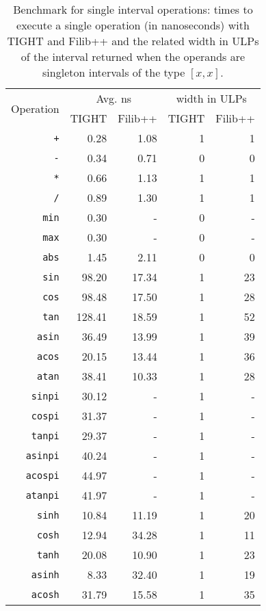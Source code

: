 
\begin{table}
\centering
\caption{Benchmark for single interval operations: times to execute a single operation (in nanoseconds) with TIGHT and Filib++ and the related width in ULPs of the interval returned when the operands are singleton intervals of the type $[x,x]$.}
\label{table:benchmarks}
\begin{tabular}{r|rr|rr}
\multirow{2}{*}{Operation} & \multicolumn{2}{c|}{Avg. ns} & \multicolumn{2}{c}{width in ULPs} \\
& TIGHT & Filib++ & TIGHT & Filib++ \\
\hline
\texttt{+} & 0.28 & 1.08 & 1 & 1 \\
\texttt{-} & 0.34 & 0.71 & 0 & 0 \\
\texttt{*} & 0.66 & 1.13 & 1 & 1 \\
\texttt{/} & 0.89 & 1.30 & 1 & 1 \\
\texttt{min} & 0.30 & - & 0 & - \\
\texttt{max} & 0.30 & - & 0 & - \\
\texttt{abs} & 1.45 & 2.11 & 0 & 0 \\
\texttt{sin} & 98.20 & 17.34 & 1 & 23 \\
\texttt{cos} & 98.48 & 17.50 & 1 & 28 \\
\texttt{tan} & 128.41 & 18.59 & 1 & 52 \\
\texttt{asin} & 36.49 & 13.99 & 1 & 39 \\
\texttt{acos} & 20.15 & 13.44 & 1 & 36 \\
\texttt{atan} & 38.41 & 10.33 & 1 & 28 \\
\texttt{sinpi} & 30.12 & - & 1 & - \\
\texttt{cospi} & 31.37 & - & 1 & - \\
\texttt{tanpi} & 29.37 & - & 1 & - \\
\texttt{asinpi} & 40.24 & - & 1 & - \\
\texttt{acospi} & 44.97 & - & 1 & - \\
\texttt{atanpi} & 41.97 & - & 1 & - \\
\texttt{sinh} & 10.84 & 11.19 & 1 & 20 \\
\texttt{cosh} & 12.94 & 34.28 & 1 & 11 \\
\texttt{tanh} & 20.08 & 10.90 & 1 & 23 \\
\texttt{asinh} & 8.33 & 32.40 & 1 & 19 \\
\texttt{acosh} & 31.79 & 15.58 & 1 & 35 \\

\end{tabular}
\end{table}
